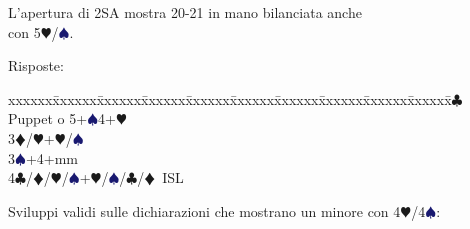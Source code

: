 \documentclass[a4paper,italian]{article}
\newcommand{\BC}{\textcolor{OliveGreen}{$\clubsuit$}}
\newcommand{\BD}{\textcolor{RedOrange}{$\vardiamondsuit$}}
\newcommand{\BH}{\textcolor{Red2}{$\varheartsuit${}}}
\newcommand{\BS}{\textcolor{MidnightBlue}{$\spadesuit${}}}
\newenvironment{bidtable}
{\begin{tabbing}

    xxxxxx\=xxxxxx\=xxxxxx\=xxxxxx\=xxxxxx\=xxxxxx\=xxxxxx\=xxxxxx\=xxxxxx\=xxxxxx\=\kill}
{\end{tabbing} }%
\newenvironment{sviluppi}
{\begin{tcolorbox}[colframe=azzurro,title=Sviluppi particolari]}
    {
\end{tcolorbox} }%
\begin{document}
\begin{multicols}{2}
    L'apertura di 2SA mostra 20-21 in mano bilanciata anche\\con 5\BH/\BS.

    Risposte:

    \begin{bidtable}
        3\BC\> Puppet o 5+\BS4+\BH\\
        3\BD/\BH{}+\BH/\BS\\
        3\BS{}+4+mm\\
        4\BC/\BD/\BH/\BS\>+\BH/\BS/\BC/\BD\ ISL\\
    \end{bidtable}

    \begin{sviluppi}
        Sviluppi validi sulle dichiarazioni che mostrano un minore con 4\BH/4\BS:


\end{sviluppi}
\end{multicols}
\end{document}
